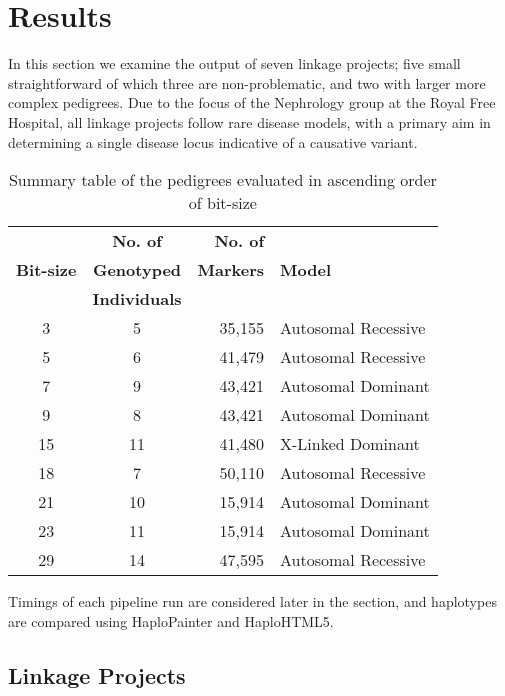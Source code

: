 \chapter{Results}

In this section we examine the output of seven linkage projects; five small straightforward of which three are non-problematic, and two with larger more complex pedigrees. Due to the focus of the Nephrology group at the Royal Free Hospital, all linkage projects follow rare disease models, with a primary aim in determining a single disease locus indicative of a causative variant.

\begin{table}[h]
\begin{center}
\begin{tabular}{ c c r l } \toprule
              & \textbf{No. of}      & \textbf{No. of}  &                  \\
\textbf{Bit-size} & \textbf{Genotyped}   & \textbf{Markers} & \textbf{Model} \\
              & \textbf{Individuals} &                  &                  \\
\midrule
3 & 5 & 35,155 & Autosomal Recessive \\
5 & 6 & 41,479 & Autosomal Recessive \\
7 & 9 & 43,421 & Autosomal Dominant \\
9 & 8 & 43,421 & Autosomal Dominant \\
15 & 11 & 41,480 & X-Linked Dominant \\
18 & 7 & 50,110 & Autosomal Recessive \\
21 & 10 & 15,914 & Autosomal Dominant \\
23 & 11 & 15,914 & Autosomal Dominant \\
29 & 14 & 47,595 & Autosomal Recessive \\
\hline
\end{tabular}
\end{center}
\caption{Summary table of the pedigrees evaluated in ascending order of bit-size}\label{table:haplo:trioalleles}
\end{table}

Timings of each pipeline run are considered later in the section, and haplotypes are compared using HaploPainter and HaploHTML5.


\section{Linkage Projects}

